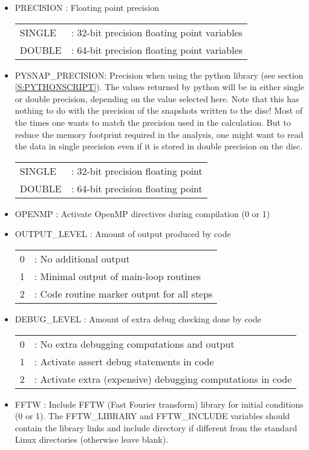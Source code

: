 \documentclass[a4paper]{article}
\begin{document}
\begin{itemize}
\item PRECISION : Floating point precision \\
\begin{tabular}{ll}
SINGLE & : 32-bit precision floating point variables \\
DOUBLE & : 64-bit precision floating point variables
\end{tabular}

\item PYSNAP\_PRECISION: Precision when using the python library (see section \ref{S:PYTHONSCRIPT}). The values returned by python will be in either single or double precision, depending on the value selected here. Note that this has nothing to do with the precision of the snapshots written to the disc! Most of the times one wants to match the precision used in the calculation. But to reduce the memory footprint required in the analysis, one might want to read the data in single precision even if it is stored in double precision on the disc.\\
\begin{tabular}{ll}
SINGLE & : 32-bit precision floating point \\
DOUBLE & : 64-bit precision floating point
\end{tabular}

\item OPENMP : Activate OpenMP directives during compilation (0 or 1)

\item OUTPUT\_LEVEL : Amount of output produced by code \\
\begin{tabular}{ll}
0 & : No additional output \\
1 & : Minimal output of main-loop routines \\
2 & : Code routine marker output for all steps
\end{tabular}

\item DEBUG\_LEVEL : Amount of extra debug checking done by code \\
\begin{tabular}{ll}
0 & : No extra debugging computations and output \\
1 & : Activate assert debug statements in code \\
2 & : Activate extra (expensive) debugging computations in code
\end{tabular}

\item FFTW : Include FFTW (Fast Fourier transform) library for initial conditions (0 or 1).  The FFTW\_LIBRARY and FFTW\_INCLUDE variables should contain the library links and include directory if different from the standard Linux directories (otherwise leave blank).


\end{itemize}
\end{document}

